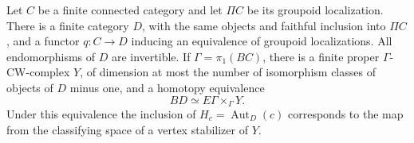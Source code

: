 \begin{lemma}\label{A:groupoid-image}
Let $C$ be a finite connected category and let $\Pi C$ be its groupoid
localization. There is a finite category $D$, with the same objects and
faithful inclusion into $\Pi C$, and a functor $q:C\to D$ inducing an
equivalence of groupoid localizations. All endomorphisms of $D$ are
invertible. If $\Gamma=\pi_1(BC)$, there is a finite proper
$\Gamma$-CW-complex $Y$, of dimension at most the number of isomorphism
classes of objects of $D$ minus one, and a homotopy equivalence
\[
 BD\simeq E\Gamma\times_\Gamma Y.                       \tag{A.4}
\]
Under this equivalence the inclusion of
$H_c=\operatorname{Aut}_D(c)$ corresponds to the map from the classifying
space of a vertex stabilizer of $Y$.
\end{lemma}
